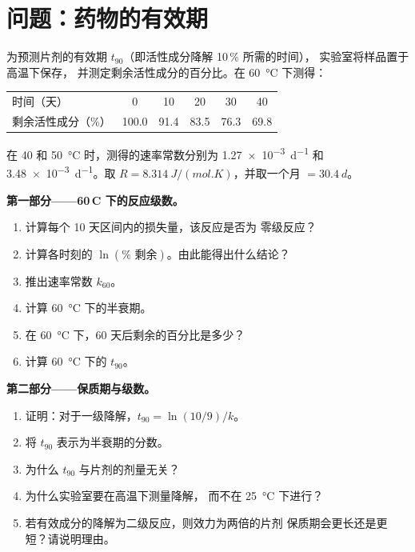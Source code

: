 \section{问题：药物的有效期}

\begin{problem}
\label{pb:b1:rate-laws:1}
为预测片剂的有效期 $t_{90}$（即活性成分降解 10\,\% 所需的时间），
实验室将样品置于高温下保存，
并测定剩余活性成分的百分比。在
\qty{60}{\celsius} 下测得：
\begin{center}
\begin{tabular}{lccccc}
\hline
时间（天） & 0 & 10 & 20 & 30 & 40 \\
剩余活性成分（\%） & 100.0 & 91.4 & 83.5 & 76.3 & 69.8 \\
\hline
\end{tabular}
\end{center}
在 40 和 \qty{50}{\celsius} 时，测得的速率常数分别为
\qty{1.27e-3}{d^{-1}} 和 \qty{3.48e-3}{d^{-1}}。取 $R =
\qty{8.314}{J/(mol.K)}$，并取一个月 $= \qty{30.4}{d}$。

\medskip
\noindent\textbf{第一部分——60\,\textdegree C 下的反应级数。}
\begin{enumerate}
  \item 计算每个 10 天区间内的损失量，该反应是否为
        零级反应？
  \item 计算各时刻的 $\ln(\%\text{ 剩余})$。由此能得出什么结论？
  \item 推出速率常数 $k_{60}$。
  \item 计算 \qty{60}{\celsius} 下的半衰期。
  \item 在 \qty{60}{\celsius} 下，60 天后剩余的百分比是多少？
  \item 计算 \qty{60}{\celsius} 下的 $t_{90}$。
\end{enumerate}

\medskip
\noindent\textbf{第二部分——保质期与级数。}
\begin{enumerate}[resume]
  \item 证明：对于一级降解，$t_{90} = \ln(10/9)/k$。
  \item 将 $t_{90}$ 表示为半衰期的分数。
  \item 为什么 $t_{90}$ 与片剂的剂量无关？
  \item 为什么实验室要在高温下测量降解，
        而不在 \qty{25}{\celsius} 下进行？
  \item 若有效成分的降解为二级反应，则效力为两倍的片剂
        保质期会更长还是更短？请说明理由。
\end{enumerate}


\end{problem}

